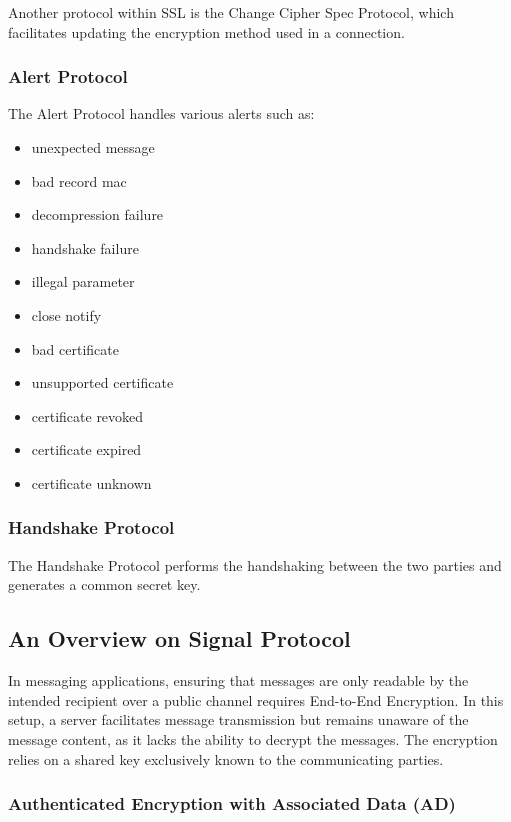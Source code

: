 \documentclass[11pt]{article}
\begin{document}
Another protocol within SSL is the Change Cipher Spec Protocol, which facilitates updating the encryption method used in a connection.

\subsubsection{Alert Protocol}

The Alert Protocol handles various alerts such as:

\begin{itemize}
    \item unexpected message
    \item bad record mac
    \item decompression failure
    \item handshake failure
    \item illegal parameter
    \item close notify
    \item bad certificate
    \item unsupported certificate
    \item certificate revoked
    \item certificate expired
    \item certificate unknown
\end{itemize}

\subsubsection{Handshake Protocol}

The Handshake Protocol performs the handshaking between the two parties and generates a common secret key.
\\
\subsection{An Overview on Signal Protocol}

In messaging applications, ensuring that messages are only readable by the intended recipient over a public channel requires End-to-End Encryption. In this setup, a server facilitates message transmission but remains unaware of the message content, as it lacks the ability to decrypt the messages. The encryption relies on a shared key exclusively known to the communicating parties.

\subsubsection{Authenticated Encryption with Associated Data (AD)}
\end{document}
